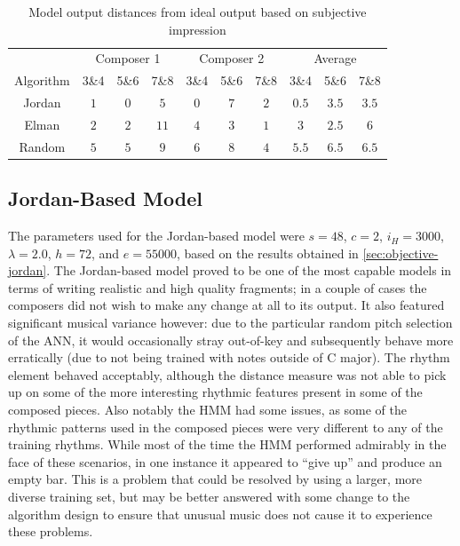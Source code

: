\documentclass[ author={Stephen Livermore-Tozer},
				supervisor={Dr. Peter Flach},
				degree={MEng},
				title={Algorithmic Co-composition Using Machine Learning},
				subtitle={},
				type={research},
				year={2016} ]{dissertation}
\begin{document}
	\begin{table}[htp]
		\begin{center}
			\begin{tabular}{cccccccccc}
				\toprule
				& \multicolumn{3}{c}{Composer 1}& \multicolumn{3}{c}{Composer 2}& \multicolumn{3}{c}{Average}\\
				Algorithm& 3\&4 & 5\&6 & 7\&8 & 3\&4 & 5\&6 & 7\&8 & 3\&4 & 5\&6 & 7\&8 \\
				\hline
				Jordan & $1$ & $0$ & $5$  & $0$ & $7$ & $2$ & $0.5$ & $3.5$ & $3.5$ \\
				Elman  & $2$ & $2$ & $11$ & $4$ & $3$ & $1$ & $3$ & $2.5$ & $6$ \\
				Random & $5$ & $5$ & $9$  & $6$ & $8$ & $4$ & $5.5$ & $6.5$ & $6.5$ \\
				\bottomrule
			\end{tabular}
		\end{center}
		\caption{Model output distances from ideal output based on subjective impression}
		\label{tab:subjective-results}
	\end{table}
	
	\subsection{Jordan-Based Model}
	
	The parameters used for the Jordan-based model were $s = 48$, $c = 2$, $i_H = 3000$, $\lambda = 2.0$, $h = 72$, and $e = 55000$, based on the results obtained in \ref{sec:objective-jordan}. The Jordan-based model proved to be one of the most capable models in terms of writing realistic and high quality fragments; in a couple of cases the composers did not wish to make any change at all to its output. It also featured significant musical variance however: due to the particular random pitch selection of the ANN, it would occasionally stray out-of-key and subsequently behave more erratically (due to not being trained with notes outside of C major). The rhythm element behaved acceptably, although the distance measure was not able to pick up on some of the more interesting rhythmic features present in some of the composed pieces. Also notably the HMM had some issues, as some of the rhythmic patterns used in the composed pieces were very different to any of the training rhythms. While most of the time the HMM performed admirably in the face of these scenarios, in one instance it appeared to ``give up'' and produce an empty bar. This is a problem that could be resolved by using a larger, more diverse training set, but may be better answered with some change to the algorithm design to ensure that unusual music does not cause it to experience these problems. 
	
\end{document}
